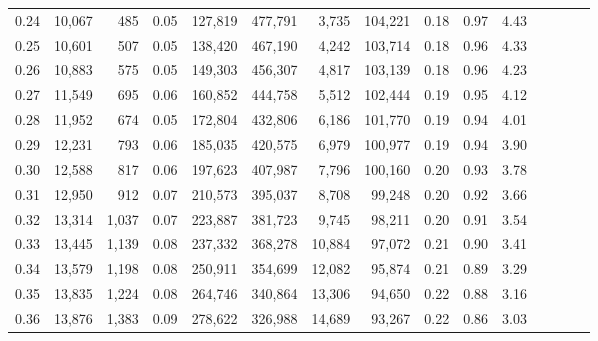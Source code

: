 \begin{tabular}{rrrcrrrrrrrrrrr}
0.24 &  10,067 &    485 &                                       0.05 &  127,819 &  477,791 &    3,735 &  104,221 &  0.18 &  0.97 &                         4.43 \\
0.25 &  10,601 &    507 &                                       0.05 &  138,420 &  467,190 &    4,242 &  103,714 &  0.18 &  0.96 &                         4.33 \\
0.26 &  10,883 &    575 &                                       0.05 &  149,303 &  456,307 &    4,817 &  103,139 &  0.18 &  0.96 &                         4.23 \\
0.27 &  11,549 &    695 &                                       0.06 &  160,852 &  444,758 &    5,512 &  102,444 &  0.19 &  0.95 &                         4.12 \\
0.28 &  11,952 &    674 &                                       0.05 &  172,804 &  432,806 &    6,186 &  101,770 &  0.19 &  0.94 &                         4.01 \\
0.29 &  12,231 &    793 &                                       0.06 &  185,035 &  420,575 &    6,979 &  100,977 &  0.19 &  0.94 &                         3.90 \\
0.30 &  12,588 &    817 &                                       0.06 &  197,623 &  407,987 &    7,796 &  100,160 &  0.20 &  0.93 &                         3.78 \\
0.31 &  12,950 &    912 &                                       0.07 &  210,573 &  395,037 &    8,708 &   99,248 &  0.20 &  0.92 &                         3.66 \\
0.32 &  13,314 &  1,037 &                                       0.07 &  223,887 &  381,723 &    9,745 &   98,211 &  0.20 &  0.91 &                         3.54 \\
0.33 &  13,445 &  1,139 &                                       0.08 &  237,332 &  368,278 &   10,884 &   97,072 &  0.21 &  0.90 &                         3.41 \\
0.34 &  13,579 &  1,198 &                                       0.08 &  250,911 &  354,699 &   12,082 &   95,874 &  0.21 &  0.89 &                         3.29 \\
0.35 &  13,835 &  1,224 &                                       0.08 &  264,746 &  340,864 &   13,306 &   94,650 &  0.22 &  0.88 &                         3.16 \\
0.36 &  13,876 &  1,383 &                                       0.09 &  278,622 &  326,988 &   14,689 &   93,267 &  0.22 &  0.86 &                         3.03 \\

\end{tabular}
